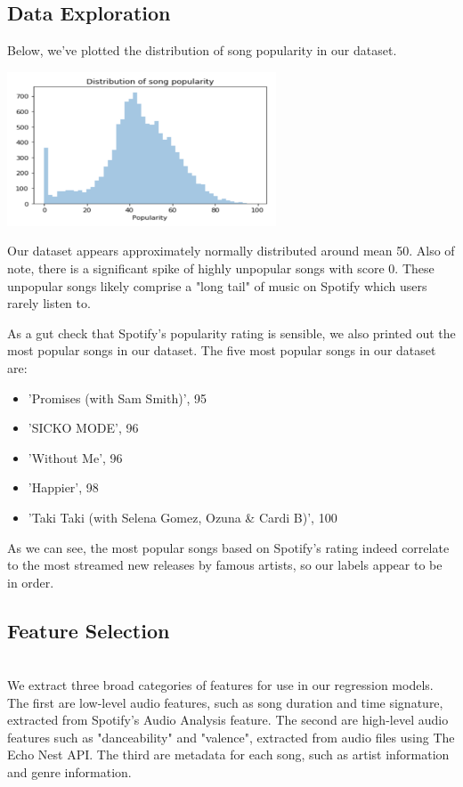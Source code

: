 \documentclass[journal]{IEEEtran}
\begin{document}
\subsection{Data Exploration}

Below, we've plotted the distribution of song popularity in our dataset.

\includegraphics[width=8cm]{images/popularity_distribution.png}

Our dataset appears approximately normally distributed around mean 50. Also of note, there is a significant spike of highly unpopular songs with score 0. These unpopular songs likely comprise a "long tail" of music on Spotify which users rarely listen to.

As a gut check that Spotify's popularity rating is sensible, we also printed out the most popular songs in our dataset. The five most popular songs in our dataset are:
\begin{itemize}
  \item 'Promises (with Sam Smith)', 95
  \item 'SICKO MODE', 96
  \item 'Without Me', 96
  \item 'Happier', 98
  \item 'Taki Taki (with Selena Gomez, Ozuna & Cardi B)', 100
\end{itemize}

As we can see, the most popular songs based on Spotify's rating indeed correlate to the most streamed new releases by famous artists, so our labels appear to be in order.

\subsection{Feature Selection} \\
We extract three broad categories of features for use in our regression models. The first are low-level audio features, such as song duration and time signature, extracted from Spotify's Audio Analysis feature. The second are high-level audio features such as "danceability" and "valence", extracted from audio files using The Echo Nest API. The third are metadata for each song, such as artist information and genre information. \\
\end{document}
